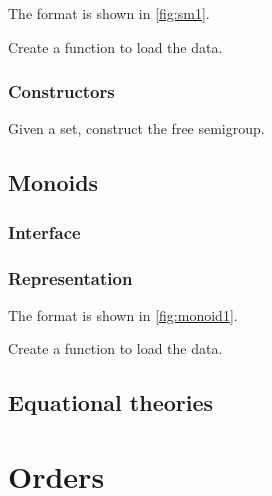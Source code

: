The format is shown in \cref{fig:sm1}.


\begin{exercise}[Representation]
  Create a function to load the data.



\end{exercise}

\subsection*{Constructors}

\begin{exercise}
  Given a set, construct the free semigroup.

\end{exercise}


\section{Monoids}

\subsection*{Interface}



\subsection*{Representation}

The format is shown in \cref{fig:monoid1}.



\begin{exercise}[Representation]
  Create a function to load the data.


%

\end{exercise}


\section{Equational theories}



\chapter{Orders}



